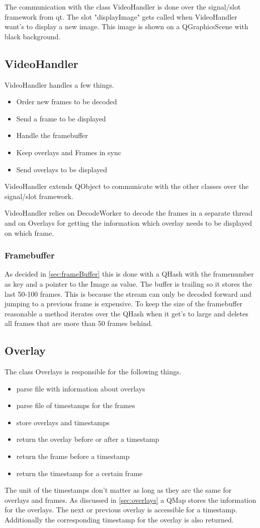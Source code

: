 The communication with the class VideoHandler is done over the signal/slot framework from qt. The slot "displayImage" gets called when VideoHandler want's to display a new image. This image is shown on a QGraphicsScene with black background.
\subsection{VideoHandler}
\label{sec:videoHanlder}
VideoHandler handles a few things.
\begin{itemize}
	\item Order new frames to be decoded
	\item Send a frame to be displayed
	\item Handle the framebuffer
	\item Keep overlays and Frames in sync
	\item Send overlays to be displayed
\end{itemize}
VideoHandler extends QObject to communicate with the other classes over the signal/slot framework.

VideoHandler relies on DecodeWorker to decode the frames in a separate thread and on Overlays for getting the information which overlay needs to be displayed on which frame.
\subsubsection{Framebuffer}
\label{sec:framebuffer}
As decided in \ref{sec:frameBuffer} this is done with a QHash with the framenumber as key and a pointer to the Image as value. The buffer is trailing so it stores the last 50-100 frames. This is because the stream can only be decoded forward and jumping to a previous frame is expensive. To keep the size of the framebuffer reasonable a method iterates over the QHash when it get's to large and deletes all frames that are more than 50 frames behind.
\subsection{Overlay}
\label{sec:overlayClass}
The class Overlays is responsible for the following things.
\begin{itemize}
	\item parse file with information about overlays
	\item parse file of timestamps for the frames
	\item store overlays and timestamps
	\item return the overlay before or after a timestamp
	\item return the frame before a timestamp
	\item return the timestamp for a certain frame
\end{itemize}
The unit of the timestamps don't matter as long as they are the same for overlays and frames. 
As discussed in \ref{sec:overlays} a QMap stores the information for the overlays. The next or previous overlay is accessible for a timestamp. Additionally the corresponding timestamp for the overlay is also returned.
